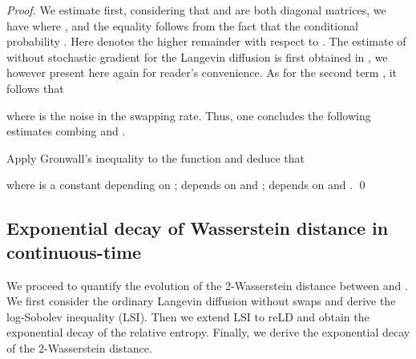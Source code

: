 \begin{proof}
We estimate  first, considering that  and  are both diagonal matrices, we have
{}
where , and the equality follows from the fact that the conditional probability . Here  denotes the higher remainder with respect to . The estimate of  without stochastic gradient for the Langevin diffusion is first obtained in \citet{chen2018accelerating}, we however present here again for reader's convenience.  
As for the second term , it follows that

where  is the noise in the swapping rate. Thus, one concludes the following estimates combing  and .

Apply Gronwall's inequality to the function
{}
and deduce that 

where  is a constant depending on ;  depends on  and ;  depends on  and . \qed 


\end{proof}


\subsection{Exponential decay of Wasserstein distance in continuous-time}


We proceed to quantify the evolution of the 2-Wasserstein distance between  and . We first consider the ordinary Langevin diffusion without swaps and derive the log-Sobolev inequality (LSI). Then we extend LSI to reLD and obtain the exponential decay of the relative entropy. Finally, we derive the exponential decay of the 2-Wasserstein distance.


